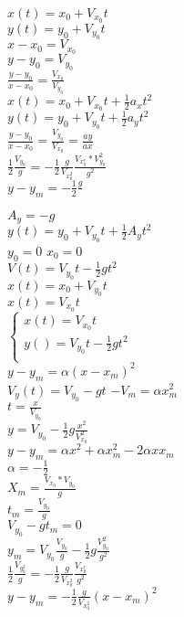 \documentclass{book}
\begin{document}
\begin{multicols}{3}
	$x(t)=x_0+V_{x_0}t$\\
	$y(t)=y_0+V_{y_0}t$\\
	$x-x_0=V_{x_0}$\\
	$y-y_0=V_{y_0}$\\
	$\frac{y-y_0}{x-x_0}=\frac{V_{x_0}}{V_{y_0}}$\\
	$x(t)=x_0+V_{x_0}t+\frac{1}{2}a_xt^2$\\
	$y(t)=y_0+V_{y_0}t+\frac{1}{2}a_yt^2$\\
	$\frac{y-y_0}{x-x_0}=\frac{V_{y_0}}{V_{x_0}}=\frac{ay}{ax}$\\
	$\frac{1}{2}\frac{V_{y_0}}{g}=-\frac{1}{2}\frac{g}{V_{x^2_0}}\frac{V_{x^r_0}*V^2_{y_0}}{g^2}$\\
	$y-y_m=-\frac{1}{2}\frac{g}{}$
\end{multicols}
\begin{multicols}{3}
	$A_y=-g$\\
	$y(t)=y_0+V_{y_0}t+\frac{1}{2}A_yt^2$\\
	$y_0=0$ $x_0=0$\\
	$V(t)=V_{y_0}t-\frac{1}{2}gt^2$\\
	$x(t)=x_0+V_{y_0}t$\\
	$x(t)=V_{x_0}t$\\
	$\begin{cases}
		x(t)=V_{x_0}t\\
		y()=V_{y_0}t-\frac{1}{2}gt^2\\
	\end{cases}$\\
	$y-y_m=\alpha(x-x_m)^2$\\
	$V_y(t)=V_{y_0}-gt$
	$-V_m=\alpha x^2_m$\\
	$t=\frac{x}{V_{y_0}}$\\
	$y=V_{y_0}-\frac{1}{2}g\frac{x^2}{V_{x_0}^2}$\\
	$y-y_m=\alpha x^2+\alpha x^2_m-2\alpha x x_m$\\
	$\alpha=-\frac{1}{2}$\\
	$X_m=\frac{V_{x_0}*V_{y_0}}{g}$\\
	$t_m=\frac{V_{y_0}}{g}$\\
	$V_{y_0}-gt_m=0$\\
	$y_m=V_{y_0}\frac{V_{y_0}}{g}-\frac{1}{2}g\frac{V^2_{y_0}}{g^2}$\\
	$\frac{1}{2}\frac{V_{y_{0}^2}}{g}=-\frac{1}{2}\frac{g}{V_{x_0^2}}\frac{V_{x^r_0}}{g^2}$\\
	$y-y_m=-\frac{1}{2}\frac{g}{V_{x_{0}^2}}(x-x_m)^2$\\
\end{multicols}
\end{document}
